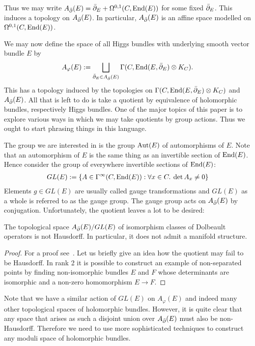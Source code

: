 \documentclass[12pt]{ociamthesis}  %
\begin{document}
Thus we may write $A_{\bar{\partial}} (E) = {\bar{\partial}}_E + \Omega^{0,1}(C,\operatorname{End}(E))$
for some fixed ${\bar{\partial}}_E$. This induces a topology on $A_{\bar{\partial}} (E)$.
In particular, $A_{\bar{\partial}} (E)$ is an affine space modelled on
$\Omega^{0,1}(C,\operatorname{End}(E))$.

We may now define the space of all Higgs bundles with underlying
smooth vector bundle $E$ by
\begin{align*}
  A_\varphi(E) := \bigsqcup_{{\bar{\partial}}_E \in A_{\bar{\partial}} (E)} \Gamma(C,\operatorname{End}(E,{\bar{\partial}}_E)\otimes K_C).
\end{align*}
This has a topology induced by the topologies on
$\Gamma(C,\operatorname{End}(E,{\bar{\partial}}_E)\otimes K_C)$ and $A_{\bar{\partial}} (E)$.
All that is left to do is take a quotient by equivalence of holomorphic
bundles, respectively Higgs bundles. One of the major topics of this
paper is to explore various ways in which we may take quotients by
group actions. Thus we ought to start phrasing things in this language.

The group we are interested in is the group $\operatorname{Aut}(E)$ of automorphisms
of $E$. Note that an automorphism of $E$ is the same thing as
an invertible section of $\operatorname{End}(E)$. Hence consider the group
of everywhere invertible sections of $\operatorname{End}(E)$:
\begin{align*}
  GL(E) := \{A \in \Gamma^\infty(C,\operatorname{End}(E)) : \forall x \in C.\:\det A_x \neq 0\}
\end{align*}
Elements $g\in GL(E)$ are usually called gauge transformations and
$GL(E)$ as a whole is referred to as the gauge group.
The gauge group acts on $A_{\bar{\partial}}(E)$ by conjugation.
Unfortunately, the quotient leaves a lot to be desired:
\begin{lemma}
  The topological space $A_{\bar{\partial}} (E)/GL(E)$ of isomorphism classes of
  Dolbeault operators is not Hausdorff. In particular, it does not
  admit a manifold structure.
  \begin{proof}
    For a proof see~\cite{norton1978}. Let us briefly give an idea
    how the quotient may fail to be Hausdorff. In rank 2 it is possible
    to construct an example of non-separated points by finding
    non-isomorphic bundles $E$ and $F$ whose determinants are
    isomorphic and a non-zero homomorphism $E\to F$.
  \end{proof}
\end{lemma}

Note that we have a similar action of $GL(E)$ on $A_\varphi(E)$ and
indeed many other topological spaces of holomorphic bundles. However,
it is quite clear that any space that arises as such a disjoint union
over $A_{\bar{\partial}} (E)$ must also be non-Hausdorff. Therefore we need
to use more sophisticated techniques to construct any moduli
space of holomorphic bundles.
\end{document}
